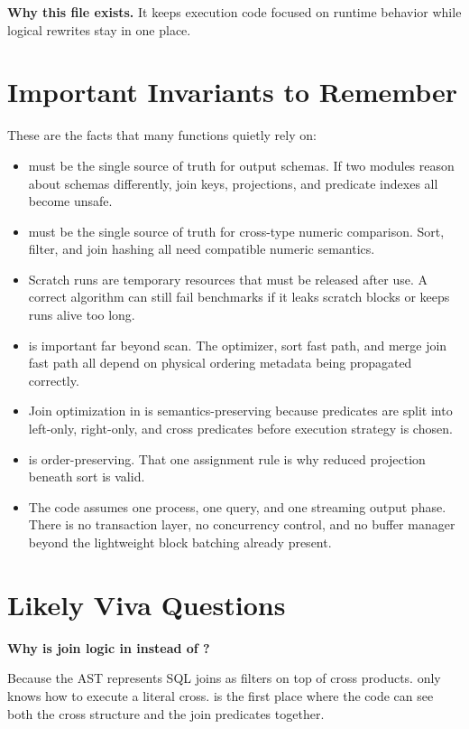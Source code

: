 \documentclass[11pt]{article}
\begin{document}
\textbf{Why this file exists.} It keeps execution code focused on runtime behavior while logical rewrites stay in one place.

\section{Important Invariants to Remember}
These are the facts that many functions quietly rely on:

\begin{itemize}[leftmargin=*]
    \item {} must be the single source of truth for output schemas. If two modules reason about schemas differently, join keys, projections, and predicate indexes all become unsafe.
    \item {} must be the single source of truth for cross-type numeric comparison. Sort, filter, and join hashing all need compatible numeric semantics.
    \item Scratch runs are temporary resources that must be released after use. A correct algorithm can still fail benchmarks if it leaks scratch blocks or keeps runs alive too long.
    \item {} is important far beyond scan. The optimizer, sort fast path, and merge join fast path all depend on physical ordering metadata being propagated correctly.
    \item Join optimization in  is semantics-preserving because predicates are split into left-only, right-only, and cross predicates before execution strategy is chosen.
    \item {} is order-preserving. That one assignment rule is why reduced projection beneath sort is valid.
    \item The code assumes one process, one query, and one streaming output phase. There is no transaction layer, no concurrency control, and no buffer manager beyond the lightweight block batching already present.
\end{itemize}

\section{Likely Viva Questions}
\textbf{Why is join logic in  instead of ?}

Because the AST represents SQL joins as filters on top of cross products.  only knows how to execute a literal cross.  is the first place where the code can see both the cross structure and the join predicates together.
\end{document}

